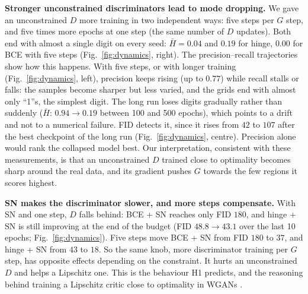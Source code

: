 \documentclass[10pt,a4paper]{article}
\newcommand{\Hc}{\bar H}
\begin{document}
\textbf{Stronger unconstrained discriminators lead to mode dropping.} We gave an unconstrained $D$ more training in two independent ways: five steps per $G$ step, and five times more epochs at one step (the same number of $D$ updates). Both end with almost a single digit on every seed: $\Hc=0.04$ and $0.19$ for hinge, $0.00$ for BCE with five steps (Fig.~\ref{fig:dynamics}, right). The precision--recall trajectories show how this happens. With five steps, or with longer training (Fig.~\ref{fig:dynamics}, left), precision keeps rising (up to $0.77$) while recall stalls or falls: the samples become sharper but less varied, and the grids end with almost only ``1''s, the simplest digit. The long run loses digits gradually rather than suddenly ($\Hc$: $0.94\to0.19$ between 100 and 500 epochs), which points to a drift and not to a numerical failure. FID detects it, since it rises from $42$ to $107$ after the best checkpoint of the long run (Fig.~\ref{fig:dynamics}, centre). Precision alone would rank the collapsed model best. Our interpretation, consistent with these measurements, is that an unconstrained $D$ trained close to optimality becomes sharp around the real data, and its gradient pushes $G$ towards the few regions it scores highest.

\textbf{SN makes the discriminator slower, and more steps compensate.} With SN and one step, $D$ falls behind: BCE + SN reaches only FID $180$, and hinge + SN is still improving at the end of the budget (FID $48.8\to43.1$ over the last 10 epochs; Fig.~\ref{fig:dynamics}). Five steps move BCE + SN from FID $180$ to $37$, and hinge + SN from $43$ to $18$. So the same knob, more discriminator training per $G$ step, has opposite effects depending on the constraint. It hurts an unconstrained $D$ and helps a Lipschitz one. This is the behaviour H1 predicts, and the reasoning behind training a Lipschitz critic close to optimality in WGANs \cite{arjovsky2017}.
\end{document}
